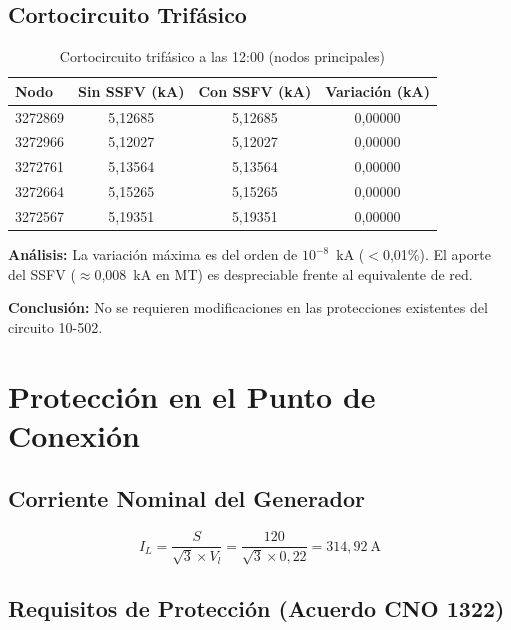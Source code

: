 \subsection{Cortocircuito Trifásico}

\begin{table}[H]
    \centering
    \caption{Cortocircuito trifásico a las 12:00 (nodos principales)}
    \begin{tabular}{lccc}
    \toprule
    \textbf{Nodo} & \textbf{Sin SSFV (kA)} & \textbf{Con SSFV (kA)} & \textbf{Variación (kA)} \\
    \midrule
    3272869 & 5,12685 & 5,12685 & 0,00000 \\
    3272966 & 5,12027 & 5,12027 & 0,00000 \\
    3272761 & 5,13564 & 5,13564 & 0,00000 \\
    3272664 & 5,15265 & 5,15265 & 0,00000 \\
    3272567 & 5,19351 & 5,19351 & 0,00000 \\
    \bottomrule
    \end{tabular}
\end{table}

\textbf{Análisis:} La variación máxima es del orden de $10^{-8}$~kA ($<$0,01\%). El aporte del SSFV ($\approx$0,008~kA en MT) es despreciable frente al equivalente de red.

\textbf{Conclusión:} No se requieren modificaciones en las protecciones existentes del circuito 10-502.

\section{Protección en el Punto de Conexión}

\subsection{Corriente Nominal del Generador}

\begin{equation}
I_L = \frac{S}{\sqrt{3}\times V_l} = \frac{120}{\sqrt{3}\times 0{,}22} = 314{,}92~\text{A}
\end{equation}

\subsection{Requisitos de Protección (Acuerdo CNO 1322)}

